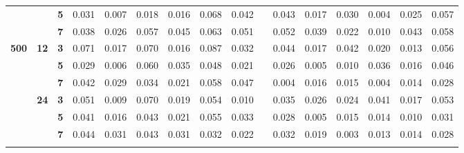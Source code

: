 \documentclass[a4paper,man,natbib]{apa6}
\begin{document}
\begin{linenumbers}
\begin{table}[h]
\begin{center}
{\begin{tabular}{cccllllllcllllll}
		&
		&
		\textbf{5} &
		0.031 &
		0.007 &
		0.018 &
		0.016 &
		0.068 &
		0.042 &
		&
		0.043 &
		0.017 &
		0.030 &
		0.004 &
		0.025 &
		0.057 \\ \cline{3-16} 
		&
		&
		\textbf{7} &
		0.038 &
		0.026 &
		0.057 &
		0.045 &
		0.063 &
		0.051 &
		&
		0.052 &
		0.039 &
		0.022 &
		0.010 &
		0.043 &
		0.058 \\ \hline
		\multirow{6}{*}{\textbf{500}} &
		\multirow{3}{*}{\textbf{12}} &
		\textbf{3} &
		0.071 &
		0.017 &
		0.070 &
		0.016 &
		0.087 &
		0.032 &
		&
		0.044 &
		0.017 &
		0.042 &
		0.020 &
		0.013 &
		0.056 \\ \cline{3-16} 
		&
		&
		\textbf{5} &
		0.029 &
		0.006 &
		0.060 &
		0.035 &
		0.048 &
		0.021 &
		&
		0.026 &
		0.005 &
		0.010 &
		0.036 &
		0.016 &
		0.046 \\ \cline{3-16} 
		&
		&
		\textbf{7} &
		0.042 &
		0.029 &
		0.034 &
		0.021 &
		0.058 &
		0.047 &
		&
		0.004 &
		0.016 &
		0.015 &
		0.004 &
		0.014 &
		0.028 \\ \cline{2-16} 
		&
		\multirow{3}{*}{\textbf{24}} &
		\textbf{3} &
		0.051 &
		0.009 &
		0.070 &
		0.019 &
		0.054 &
		0.010 &
		&
		0.035 &
		0.026 &
		0.024 &
		0.041 &
		0.017 &
		0.053 \\ \cline{3-16} 
		&
		&
		\textbf{5} &
		0.041 &
		0.016 &
		0.043 &
		0.021 &
		0.055 &
		0.033 &
		&
		0.028 &
		0.005 &
		0.015 &
		0.014 &
		0.010 &
		0.031 \\ \cline{3-16} 
		&
		&
		\textbf{7} &
		0.044 &
		0.031 &
		0.043 &
		0.031 &
		0.032 &
		0.022 &
		&
		0.032 &
		0.019 &
		0.003 &
		0.013 &
		0.014 &
		0.028 \\ \hline
		\multicolumn{1}{l}{} &
		\multicolumn{1}{l}{} &
		\multicolumn{1}{l}{} &
		\multicolumn{1}{c}{} &
		\multicolumn{1}{c}{} &
		\multicolumn{1}{c}{} &
		\multicolumn{1}{c}{} &
		\multicolumn{1}{c}{} &
		\multicolumn{1}{c}{} &
		&
		\multicolumn{1}{c}{} &
		\multicolumn{1}{c}{} &
		\multicolumn{1}{c}{} &
		\multicolumn{1}{c}{} &
		\multicolumn{1}{c}{} &
		\multicolumn{1}{c}{}
	\end{tabular}%
}	\end{center}
\end{table}


\end{linenumbers}
\end{document}
